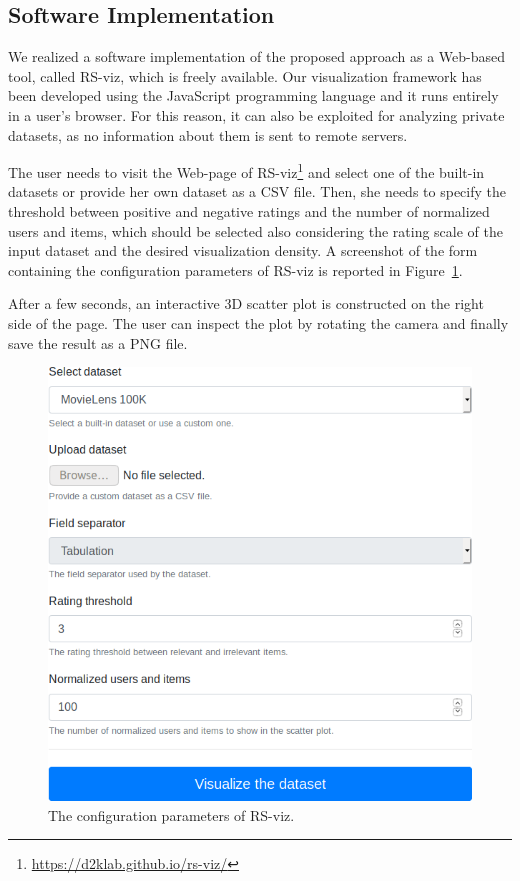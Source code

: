\subsection{Software Implementation}
\label{viz:sec:implementation}

We realized a software implementation of the proposed approach as a Web-based tool, called RS-viz, which is freely available. Our visualization framework has been developed using the JavaScript programming language and it runs entirely in a user's browser. For this reason, it can also be exploited for analyzing private datasets, as no information about them is sent to remote servers.

The user needs to visit the Web-page of RS-viz\footnote{\url{https://d2klab.github.io/rs-viz/}} and select one of the built-in datasets or provide her own dataset as a CSV file. Then, she needs to specify the threshold between positive and negative ratings and the number of normalized users and items, which should be selected also considering the rating scale of the input dataset and the desired visualization density. A screenshot of the form containing the configuration parameters of RS-viz is reported in Figure~\ref{viz:fig:rs-viz}.

After a few seconds, an interactive 3D scatter plot is constructed on the right side of the page. The user can inspect the plot by rotating the camera and finally save the result as a PNG file.

\begin{figure}
\centering
\includegraphics[width=.75\textwidth]{rs-viz}
\caption[Configuration of RS-viz]{The configuration parameters of RS-viz.}
\label{viz:fig:rs-viz}
\end{figure}

